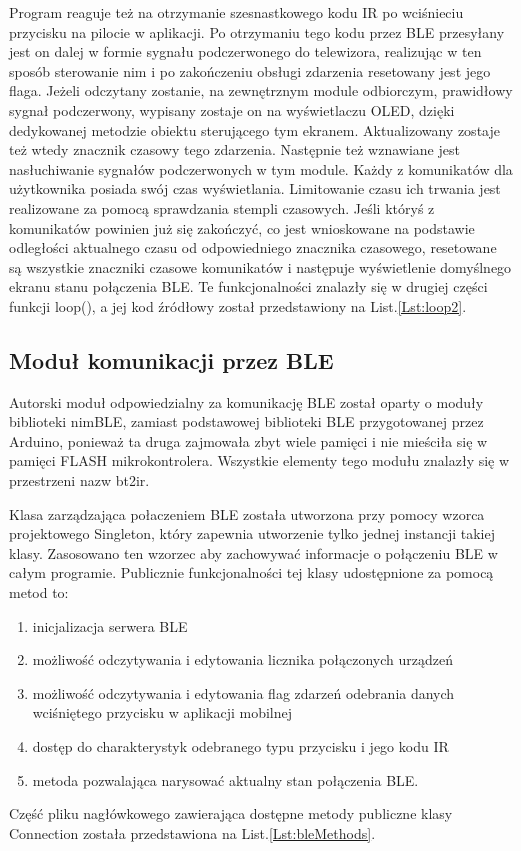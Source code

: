 \documentclass[12pt,twoside]{article}
\begin{document}
Program reaguje też na otrzymanie szesnastkowego kodu IR po wciśnieciu przycisku na pilocie w aplikacji. Po otrzymaniu tego kodu przez BLE przesyłany jest on dalej w formie sygnału podczerwonego do telewizora, realizując w ten sposób sterowanie nim i po zakończeniu obsługi zdarzenia resetowany jest jego flaga. Jeżeli odczytany zostanie, na zewnętrznym module odbiorczym, prawidłowy sygnał podczerwony, wypisany zostaje on na wyświetlaczu OLED, dzięki dedykowanej metodzie obiektu sterującego tym ekranem. Aktualizowany zostaje też wtedy znacznik czasowy tego zdarzenia. Następnie też wznawiane jest nasłuchiwanie sygnałów podczerwonych w tym module. Każdy z komunikatów dla użytkownika posiada swój czas wyświetlania. Limitowanie czasu ich trwania jest realizowane za pomocą sprawdzania stempli czasowych. Jeśli któryś z komunikatów powinien już się zakończyć, co jest wnioskowane na podstawie odległości aktualnego czasu od odpowiedniego znacznika czasowego, resetowane są wszystkie znaczniki czasowe komunikatów i następuje wyświetlenie domyślnego ekranu stanu połączenia BLE. Te funkcjonalności znalazły się w drugiej części funkcji loop(), a jej kod źródłowy został przedstawiony na List.\ref{Lst:loop2}.

\subsection{Moduł komunikacji przez BLE}
Autorski moduł odpowiedzialny za komunikację BLE został oparty o moduły biblioteki nimBLE, zamiast podstawowej biblioteki BLE przygotowanej przez Arduino, ponieważ ta druga zajmowała zbyt wiele pamięci i nie mieściła się w pamięci FLASH mikrokontrolera. Wszystkie elementy tego modułu znalazły się w przestrzeni nazw bt2ir.

Klasa zarządzająca połaczeniem BLE została utworzona przy pomocy wzorca projektowego Singleton\cite{designPatterns}, który zapewnia utworzenie tylko jednej instancji takiej klasy. Zasosowano ten wzorzec aby zachowywać informacje o połączeniu BLE w całym programie. Publicznie funkcjonalności tej klasy udostępnione za pomocą metod to:
\begin{enumerate}[label=\alph*), leftmargin=1.25cm]
   \item inicjalizacja serwera BLE
   \item możliwość odczytywania i edytowania licznika połączonych urządzeń
   \item możliwość odczytywania i edytowania flag zdarzeń odebrania danych wciśniętego przycisku w aplikacji mobilnej
   \item dostęp do charakterystyk odebranego typu przycisku i jego kodu IR 
   \item metoda pozwalająca narysować aktualny stan połączenia BLE.
\end{enumerate} Część pliku nagłówkowego zawierająca dostępne metody publiczne klasy Connection została przedstawiona na List.\ref*{Lst:bleMethods}.
\end{document}
